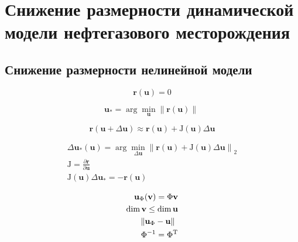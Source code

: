 \chapter{Снижение размерности динамической модели нефтегазового месторождения}\label{ch:ch2}





\section{Снижение размерности нелинейной модели}

\newcommand{\bvec}[1]{\mathbf{#1}}
\newcommand{\resid}{\bvec{r}}
\newcommand{\unk}{\bvec{u}}
\newcommand{\jac}{\mathrm{J}}
\newcommand{\dunk}{\Delta \unk}
\newcommand{\vunk}{\bvec{v}}
\newcommand{\matr}[1]{\mathrm{\uppercase{#1}}}
\newcommand{\norm}[2][~]{\left\| #2  \right\|_{#1}}
\newcommand{\transpose}[1]{\matr{#1}^\mathrm{T}}
\newcommand{\dvunk}{\Delta \vunk}
\newcommand{\deriv}[2]{\frac{\partial #1}{\partial #2}}
\newcommand{\pc}[1][~]{\bvec{\varphi}_{#1}}
\newcommand{\param}{\bvec{\mu}}
\newcommand{\nlin}{\bvec{\eta}}

\begin{equation}
   \resid(\unk) = 0
\end{equation}

\begin{equation}
    \unk_\ast = \arg \min_{\unk} \norm{\resid(\unk)}
\end{equation}

\begin{equation}
    \resid(\unk + \Delta \unk) \approx \resid(\unk) + \jac(\unk) \dunk
\end{equation}

\begin{align}
    \dunk_\ast (\unk) = \arg \min_{\dunk} \norm[2]{\resid(\unk) + \jac(\unk) \dunk} \\
    \jac = \deriv{\resid}{\unk} \\
    \jac(\unk) \dunk_\ast = - \resid(\unk)
\end{align}

\begin{align}
    \unk_\Phi (\vunk) = \Phi \vunk \\
    \dim{\vunk} \leq \dim{\unk} \\
    \norm{\unk_\Phi - \unk} \\
    \Phi^{-1} = \transpose{\Phi}
\end{align}

